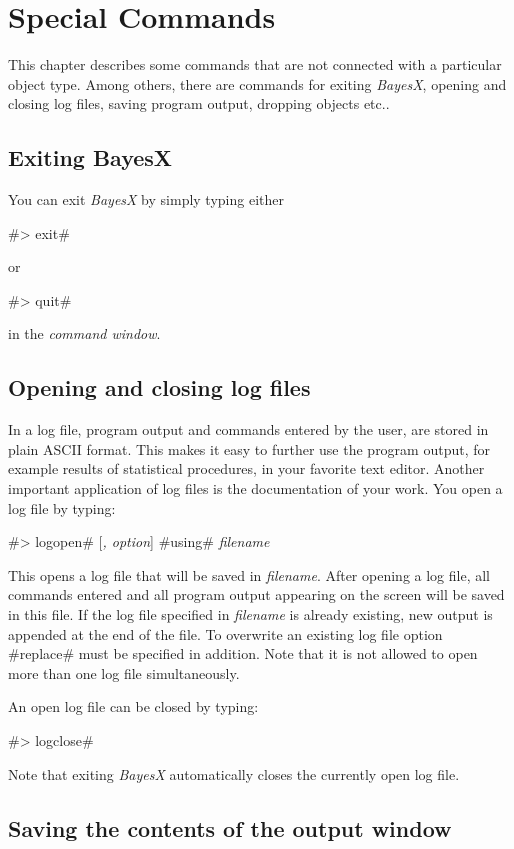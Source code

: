 \chapter{Special Commands}

This chapter describes some commands that are not connected with a
particular object type. Among others, there are commands for
exiting {\em BayesX}, opening and closing log files, saving
program output, dropping objects etc..

\section{Exiting BayesX}

You can exit {\em BayesX} by simply typing either

#> exit#

or

#> quit#

in the {\em command window}.

\section{Opening and closing log files} \label{logfile}

In a log file, program output and commands entered by the user,
are stored in plain ASCII format. This makes it easy to further
use the program output, for example results of statistical
procedures, in your favorite text editor. Another important
application of log files is
the documentation of your work. You open a log file by typing:

#> logopen# [{\em, option}] #using# {\em filename}

This opens a log file that will be saved in {\em filename}. After
opening a log file, all commands entered and all program output
appearing on the screen will be saved in this file. If the
log file specified in  {\em filename} is already existing, new
output is appended at the end of the file. To overwrite an
existing log file option #replace# must be specified in addition.
Note that it is not allowed to open more than one log file
simultaneously.

An open log file can be closed by typing:

#> logclose#

Note that exiting {\em BayesX} automatically closes the currently
open log file.

\section{Saving the contents of the output window}
 

